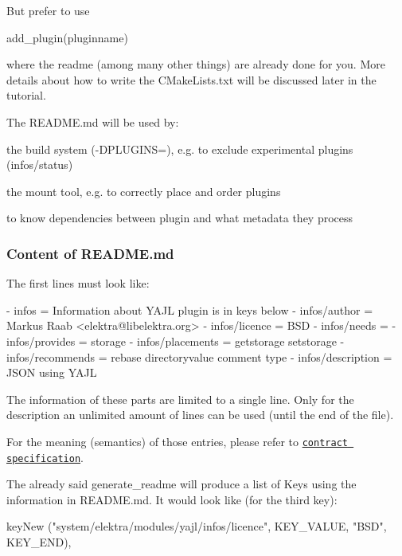 But prefer to use


\begin{DoxyCode}
add\_plugin(pluginname)
\end{DoxyCode}


where the readme (among many other things) are already done for you. More details about how to write the {\ttfamily C\+Make\+Lists.\+txt} will be discussed later in the tutorial.

The {\ttfamily R\+E\+A\+D\+M\+E.\+md} will be used by\+:


\begin{DoxyItemize}
\item the build system ({\ttfamily -\/\+D\+P\+L\+U\+G\+I\+NS=}), e.\+g. to exclude experimental plugins ({\ttfamily infos/status})
\item the mount tool, e.\+g. to correctly place and order plugins
\item to know dependencies between plugin and what metadata they process
\end{DoxyItemize}

\subsubsection*{Content of {\ttfamily R\+E\+A\+D\+M\+E.\+md}}

The first lines must look like\+:


\begin{DoxyCode}
- infos = Information about YAJL plugin is in keys below
- infos/author = Markus Raab <elektra@libelektra.org>
- infos/licence = BSD
- infos/needs =
- infos/provides = storage
- infos/placements = getstorage setstorage
- infos/recommends = rebase directoryvalue comment type
- infos/description = JSON using YAJL
\end{DoxyCode}


The information of these parts are limited to a single line. Only for the description an unlimited amount of lines can be used (until the end of the file).

For the meaning (semantics) of those entries, please refer to \href{/home/markus/Projekte/Elektra/current/doc/CONTRACT.ini}{\tt contract specification}.

The already said {\ttfamily generate\+\_\+readme} will produce a list of Keys using the information in {\ttfamily R\+E\+A\+D\+M\+E.\+md}. It would look like (for the third key)\+: \begin{DoxyVerb}    keyNew ("system/elektra/modules/yajl/infos/licence",
            KEY_VALUE, "BSD", KEY_END),
\end{DoxyVerb}


